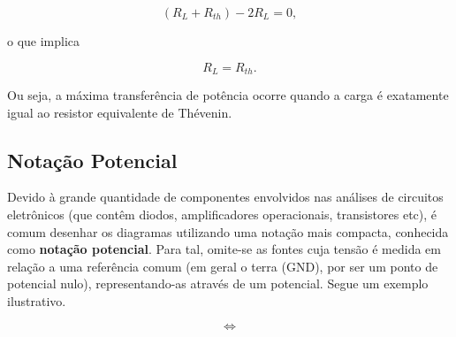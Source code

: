 \documentclass{article}
\numberwithin{equation}{section}
\newlength\Colsep
\begin{document}
\begin{equation*}
    (R_L+R_{th}) - 2R_L = 0,
\end{equation*}

\noindent o que implica

\begin{equation}
    R_L = R_{th}.
\end{equation}

Ou seja, a máxima transferência de potência ocorre quando a carga é exatamente igual ao resistor equivalente de Thévenin.

\subsection{Notação Potencial}
\label{subsec:notpot}

Devido à grande quantidade de componentes envolvidos nas análises de circuitos eletrônicos (que contêm diodos, amplificadores operacionais, transistores etc), é comum desenhar os diagramas utilizando uma notação mais compacta, conhecida como \textbf{notação potencial}. Para tal, omite-se as fontes cuja tensão é medida em relação a uma referência comum (em geral o terra (GND), por ser um ponto de potencial nulo), representando-as através de um potencial. Segue um exemplo ilustrativo.

\begin{center}
\noindent\begin{minipage}{\textwidth}
\begin{minipage}[c][5cm][c]{\dimexpr0.45\textwidth-0.5\Colsep\relax}
    \begin{center}
    \end{center}
\end{minipage} \hfill
\begin{minipage}[c][5cm][c]{\dimexpr0.1\textwidth-0.5\Colsep\relax}
    $$\iff$$
\end{minipage} \hfill
\begin{minipage}[c][5cm][c]{\dimexpr0.45\textwidth-0.5\Colsep\relax}
    \begin{center}
\end{center}
\end{minipage}
\end{minipage}
\end{center}
\end{document}
